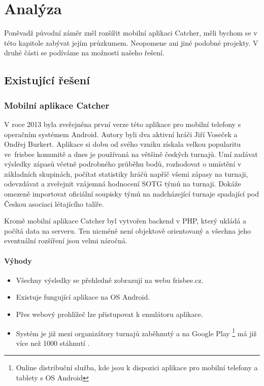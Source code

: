\chapter{Analýza}

Poněvadž původní záměr zněl rozšířit mobilní aplikaci Catcher,
měli bychom se v této kapitole zabývat jejím průzkumem. Neopomene ani jiné podobné projekty.
V druhé části se podíváme na možnosti našeho řešení.

\section{Existující řešení}

\subsection*{Mobilní aplikace Catcher}

V roce 2013 \cite{cald_catcher} byla zveřejněna první verze této aplikace pro mobilní telefony s operačním systémem Android.
Autory byli dva aktivní hráči Jiří Voseček a Ondřej Burkert. Aplikace si dobu od svého vzniku získala velkou popularitu
ve~frisbee komunitě a dnes je používaná na většině českých turnajů. Umí zadávat výsledky
zápasů včetně podrobného průběhu bodů, rozhodovat o umístění v základních skupinách, počítat statistiky hráčů napříč
všemi zápasy na turnaji, odevzdávat a zveřejnit vzájemná hodnocení SOTG týmů na turnaji. Dokáže omezeně importovat oficiální soupisky týmů
na nadcházející turnaje spadající pod Českou asociaci létajícího talíře.

Kromě mobilní aplikace Catcher byl vytvořen backend v PHP, který ukládá a počítá data na serveru. Ten nicméně není
objektově orientovaný a všechna jeho eventuální rozšíření jsou velmi náročná.

\subsubsection*{Výhody}
\begin{itemize}
  \item Všechny výsledky se přehledně zobrazují na webu frisbee.cz.
  \item Existuje fungující aplikace na OS Android.
  \item Přes webový prohlížeč lze přistupovat k emulátoru aplikace.
  \item Systém je již mezi organizátory turnajů zaběhnutý a na Google Play
    \footnote{Online distribuční služba, kde jsou k dispozici aplikace pro mobilní telefony a tablety s OS Android}
    má již více než 1000 stáhnutí \cite{catcher-play}.
\end{itemize}

